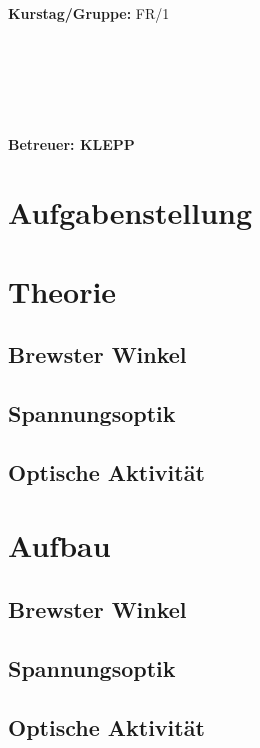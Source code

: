 \documentclass{article}
\begin{document}
\begin{verbatim}


\end{verbatim}
			\begin{flushleft}
			\textbf{\Large{Kurstag/Gruppe:}} \Large{FR/1}
			\end{flushleft}

\begin{verbatim}






\end{verbatim}
			\begin{flushleft}
			\LARGE{\textbf{Betreuer:\Large{ KLEPP }}}		
			\end{flushleft}
			
\section{Aufgabenstellung}

\section{Theorie}
\subsection{Brewster Winkel}
\subsection{Spannungsoptik}
\subsection{Optische Aktivität}

\section{Aufbau}
\subsection{Brewster Winkel}
\subsection{Spannungsoptik}
\subsection{Optische Aktivität}
\end{document}
